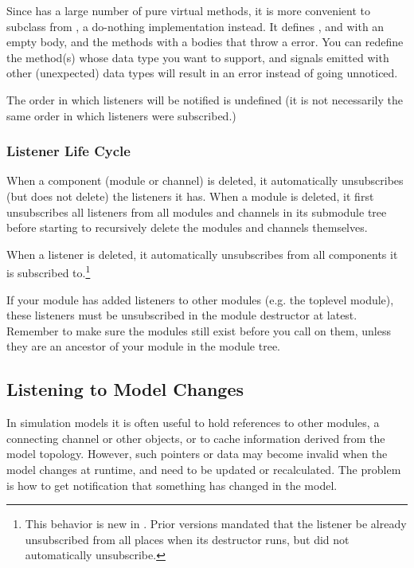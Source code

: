Since  has a large number of pure virtual methods, it is more
convenient to subclass from , a do-nothing implementation
instead. It defines ,  and
 with an empty body, and the 
methods with a bodies that throw a  error.
You can redefine the  method(s) whose data type
you want to support, and signals emitted with other (unexpected) data
types will result in an error instead of going unnoticed.

The order in which listeners will be notified is undefined (it is not necessarily
the same order in which listeners were subscribed.)

\subsubsection{Listener Life Cycle}
\label{sec:simple-modules:signals:life-cycle}

When a component (module or channel) is deleted, it automatically
unsubscribes (but does not delete) the listeners it has. When a
module is deleted, it first unsubscribes all listeners from all
modules and channels in its submodule tree before starting
to recursively delete the modules and channels themselves.

When a listener is deleted, it automatically unsubscribes from all components
it is subscribed to.\footnote{This behavior is new in {}. Prior versions
mandated that the listener be already unsubscribed from all places when its
destructor runs, but did not automatically unsubscribe.}

\begin{note}
  If your module has added listeners to other modules (e.g. the toplevel
  module), these listeners must be unsubscribed in the module
  destructor at latest. Remember to make sure the modules still exist before you
  call  on them, unless they are an ancestor
  of your module in the module tree.
\end{note}


\subsection{Listening to Model Changes}
\label{sec:simple-modules:model-change}

In simulation models it is often useful to hold references to other
modules, a connecting channel or other objects, or to cache information
derived from the model topology. However, such pointers or data may
become invalid when the model changes at runtime, and need to be updated
or recalculated. The problem is how to get notification that something has
changed in the model.

